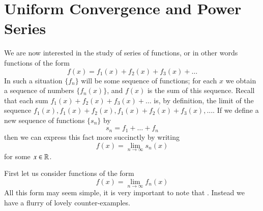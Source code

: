 \documentclass[12pt, a4paper, oneside, openright, titlepage]{book}
\begin{document}
\section{Uniform Convergence and Power Series}


\begin{rmk}
    We are now interested in the study of series of functions, or in other words functions of the form \begin{equation*}
        f(x) = f_1(x) + f_2(x) + f_3(x) + \hdots
    \end{equation*}
    In such a situation $\{f_n\}$ will be some sequence of functions; for each $x$ we obtain a sequence of numbers $\{f_n(x)\}$, and $f(x)$ is the sum of this sequence. Recall that each sum $f_1(x)+f_2(x)+f_3(x) + \hdots$ is, by definition, the limit of the sequence $f_1(x),f_1(x)+f_2(x),f_1(x)+f_2(x)+f_3(x),...$. If we define a new sequence of functions $\{s_n\}$ by \begin{equation*}
        s_n = f_1 + \hdots + f_n
    \end{equation*}
    then we can express this fact more succinctly by writing \begin{equation*}
        f(x) = \lim\limits_{n\rightarrow \infty}s_n(x)
    \end{equation*}
    for some $x \in \mathbb R$.
\end{rmk}


\begin{rmk}
    First let us consider functions of the form \begin{equation*}
        f(x) = \lim\limits_{n\rightarrow\infty}f_n(x)
    \end{equation*}
    All this form may seem simple, it is very important to note that . Instead we have a flurry of lovely counter-examples.
\end{rmk}
\end{document}
